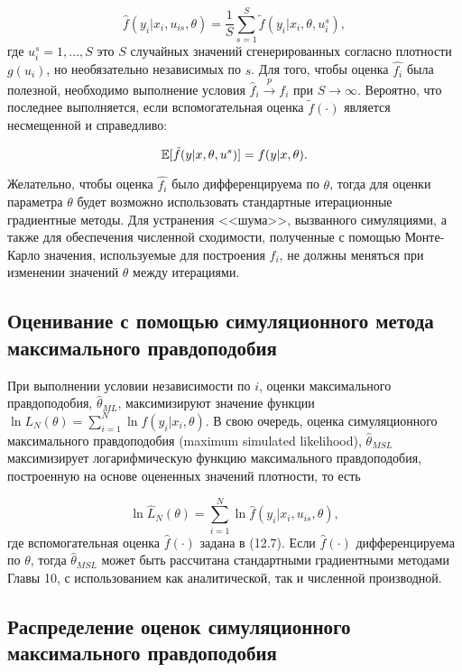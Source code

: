 \begin{equation}
\hat{f}(y_i|x_i,u_{is},\theta)=\dfrac{1}{S}\sum^{S}_{s=1}\tilde{f}(y_i|x_i,\theta,u^{s}_i),
\end{equation}
где $u^{s}_i=1,\ldots ,S$ это $S$ случайных значений сгенерированных согласно плотности $g(u_i)$, но необязательно независимых по $s$. Для того, чтобы оценка $\hat{f_i}$ была полезной, необходимо выполнение условия $\hat{f}_i \stackrel{p}{\rightarrow} f_i$ при $S \rightarrow \infty$. Вероятно, что последнее выполняется, если вспомогательная оценка $\tilde{f}(\cdot)$ является несмещенной и справедливо:

\begin{equation}
\mathbb{E}[\tilde{f}(y|x,\theta,u^s)]=f(y|x,\theta).
\end{equation}

Желательно, чтобы оценка $\hat{f_i}$ было дифференцируема по $\theta$, тогда для оценки параметра $\theta$ будет возможно использовать стандартные итерационные градиентные методы. Для устранения <<шума>>, вызванного симуляциями, а также для обеспечения численной сходимости, полученные с помощью Монте-Карло значения, используемые для построения $\hat{f}_i$, не должны меняться при изменении значений $\theta$ между итерациями. 

\subsection{Оценивание с помощью симуляционного метода максимального правдоподобия}

При выполнении условии независимости по $i$, оценки максимального правдоподобия, $\hat{\theta}_{ML}$, максимизируют значение функции $\ln{L_N}(\theta)=\sum^{N}_{i=1}\ln{f}(y_i|x_i,\theta)$. В свою очередь, оценка симуляционного максимального правдоподобия (maximum simulated likelihood), $\hat{\theta}_{MSL}$ максимизирует логарифмическую функцию максимального правдоподобия, построенную на основе оцененных значений плотности, то есть

\begin{equation}
\ln\hat{L}_{N}(\theta)=\sum^{N}_{i=1}\ln\hat{f}(y_i|x_i,u_{is},\theta),
\end{equation}
где вспомогательная оценка $\hat{f}(\cdot)$ задана в (12.7). Если $\hat{f}(\cdot)$ дифференцируема по $\theta$, тогда $\hat{\theta}_{MSL}$ может быть рассчитана стандартными градиентными методами  Главы 10, с использованием как аналитической, так и численной производной.

\subsection{Распределение оценок симуляционного максимального правдоподобия}

